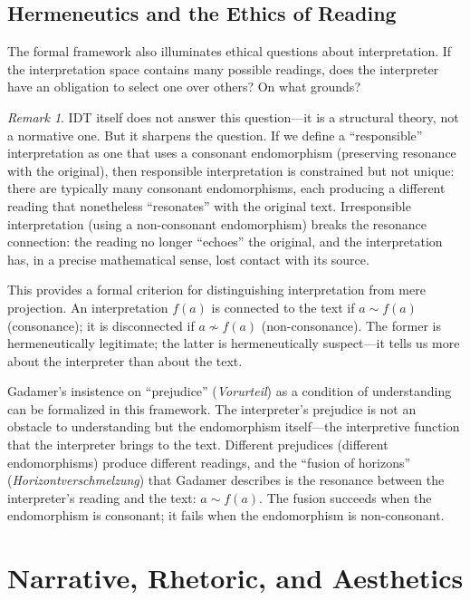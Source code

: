 \documentclass[11pt,openany]{book}
\theoremstyle{definition}
\theoremstyle{plain}
\theoremstyle{remark}
\newtheorem{remark}[axiom]{Remark}
\newcommand{\res}{\sim}                      %
\begin{document}
\section{Hermeneutics and the Ethics of Reading}

The formal framework also illuminates ethical questions about interpretation. If the interpretation space contains many possible readings, does the interpreter have an obligation to select one over others? On what grounds?

\begin{remark}
IDT itself does not answer this question---it is a structural theory, not a normative one. But it sharpens the question. If we define a ``responsible'' interpretation as one that uses a consonant endomorphism (preserving resonance with the original), then responsible interpretation is constrained but not unique: there are typically many consonant endomorphisms, each producing a different reading that nonetheless ``resonates'' with the original text. Irresponsible interpretation (using a non-consonant endomorphism) breaks the resonance connection: the reading no longer ``echoes'' the original, and the interpretation has, in a precise mathematical sense, lost contact with its source.

This provides a formal criterion for distinguishing interpretation from mere projection. An interpretation $f(a)$ is connected to the text if $a \res f(a)$ (consonance); it is disconnected if $a \not\res f(a)$ (non-consonance). The former is hermeneutically legitimate; the latter is hermeneutically suspect---it tells us more about the interpreter than about the text.

Gadamer's insistence on ``prejudice'' (\emph{Vorurteil}) as a condition of understanding can be formalized in this framework. The interpreter's prejudice is not an obstacle to understanding but the endomorphism itself---the interpretive function that the interpreter brings to the text. Different prejudices (different endomorphisms) produce different readings, and the ``fusion of horizons'' (\emph{Horizontverschmelzung}) that Gadamer describes is the resonance between the interpreter's reading and the text: $a \res f(a)$. The fusion succeeds when the endomorphism is consonant; it fails when the endomorphism is non-consonant.
\end{remark}

\chapter{Narrative, Rhetoric, and Aesthetics}
\label{ch:narrative-rhetoric}
\end{document}
